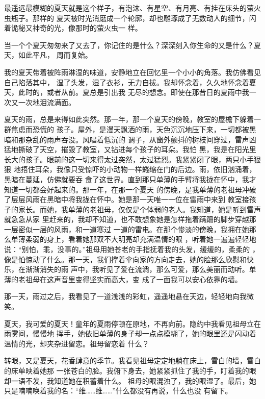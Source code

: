 \documentclass[12pt,a4paper]{article}
\begin{document}
		最遥远最模糊的夏天就是这个样子，有泡沫、有星空、有月亮、有挂在床头的萤火虫瓶子。那样的
	夏天被时光消磨成一个轮廓，却也雕琢成了无数动人的细节，闪着诡秘又神奇的光，像那时的萤火虫一
	样。

	\endwriting



		当一个个夏天匆匆来了又去了，你记住的是什么？深深刻入你生命的又是什么？夏天，如此平凡，
	周而复始。

		我的夏天带着被阵雨淋湿的味道，安静地立在回忆里一个小小的角落。我仿佛看见自己陷落其中，
	湿了头发，湿了衣衫，无力自拔。我却怀念着，久久地怀念着夏天，此时的，或者从前。夏总是引出我
	无尽的想念。即使在那昔日的夏雨中我一次又一次地泪流满面。

		夏天的雨，总是来得如此突然。那一年，那一个夏天的傍晚，教室的屋檐下躲着一群焦虑而恐慌的
	孩子。屋外，是漫天飘洒的雨，天色沉沉地压下来，一切都被黑暗和那杂乱的雨声吞没。风唱着低沉的
	调子，从窗外颤抖的树枝间穿过，雷声凶猛地撕破了天空，摧毁了教室，又钻进每个孩子的耳朵。我怕
	黑，我是在阳光里长大的孩子。眼前的这一切来得太过突然，太过猛烈。我紧紧闭了眼，两只小手狠狠
	地捂住耳朵，我像只受惊吓的小动物一样蜷缩在门的后边。雨，依旧汹涌着，黑暗在蔓延，仿佛就要吞
	食了这世界。直到那只单薄的手臂将我拢在怀中，我才知道一切都会好起来的。那一年，在那一个夏天
	的傍晚，是我单薄的老祖母冲破了层层风雨在黑暗中将我拢在怀中。她是那一天唯一一位在雷雨中来到
	教室接孩子的家长。而她，我单薄的老祖母，仅仅是个体弱的老人。我知道，她是听到雷声就急急从家
	里赶来的，我却不知道，也不敢想象她是怎样拖着蹒跚的脚步穿越那一层密似一层的风雨，和一道寒过
	一道的雷电。在那个惨淡的傍晚，我拥在她那么单薄柔弱的身上，看着她那双不大明亮却充满温情的眼
	，听着她一遍遍轻轻地说：“别怕，乖，没事的。”祖母用她苍老的手指抚着我的头发，缓缓的，柔柔的
	，像是怕惊动了什么。那一天，我们撑着伞向家的方向走去，她的脸那么欣慰和快乐，在渐渐消失的雨
	声中，我听见了爱在流淌，那么可爱，那么美丽而动听。单薄的老祖母在这声音里变得坚实而高大，变
	成了一面我可以安心依靠的墙。

		那一天，雨过之后，我看见了一道浅浅的彩虹，遥遥地悬在天边，轻轻地向我微笑。

		夏天，我可爱的夏天！童年的夏雨停顿在原地，不再向前。隐约中我看见祖母立在雨雾间，慢慢地
	挥手，她依旧单薄的身子却一点点模糊了，她的眼里还是闪动着温情的光，却夹杂进留恋。祖母留恋着
	什么？

		转眼，又是夏天，花香肆意的季节。我看见祖母定定地躺在床上，雪白的墙，雪白的床单映着她那
	一张苍白的脸。我俯下身去，她紧紧抓住了我的手，盯着我的眼却一语不发，我知道她在积蓄着什么。
	祖母的眼混浊了，我的眼湿了。最后，她只是喃喃唤着我的名：“维……维……”什么都没有再说，什么也没
	有留下。
\end{document}
